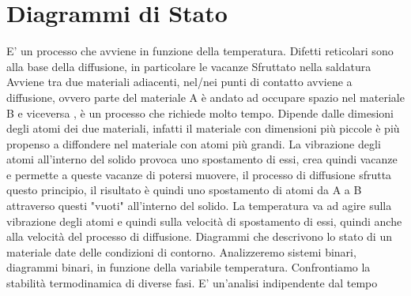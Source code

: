 \documentclass{article}%
\begin{document}
\section{ Diagrammi di Stato }%
\label{sec:DiagrammidiStato}%
E' un processo che avviene in funzione della temperatura.\newline%
%
Difetti reticolari sono alla base della diffusione, in particolare le vacanze\newline%
%
Sfruttato nella saldatura\newline%
%
Avviene tra due materiali adiacenti, nel/nei punti di contatto avviene a diffusione, ovvero parte del materiale A\newline%
%
è andato ad occupare spazio nel materiale B e viceversa , è un processo che richiede molto tempo.\newline%
%
Dipende dalle dimesioni degli atomi dei due materiali, infatti il materiale con dimensioni più piccole è più \newline%
%
propenso a diffondere nel materiale con atomi più grandi.\newline%
%
La vibrazione degli atomi all'interno del solido provoca uno spostamento di essi, crea quindi vacanze e permette\newline%
%
a queste vacanze di potersi muovere, il processo di diffusione sfrutta questo principio, il risultato è quindi uno\newline%
%
spostamento di atomi da A a B attraverso questi "vuoti" all'interno del solido.\newline%
%
La temperatura va ad agire sulla vibrazione degli atomi e quindi sulla velocità di spostamento di essi, quindi\newline%
%
anche alla velocità del processo di diffusione.\newline%
%
\newline%
%
\newline%
%
Diagrammi che descrivono lo stato di un materiale date delle condizioni di contorno.\newline%
%
Analizzeremo sistemi binari, diagrammi binari, in funzione della variabile temperatura.\newline%
%
Confrontiamo la stabilità termodinamica di diverse fasi.\newline%
%
E' un'analisi indipendente dal tempo\newline%
%
\newline%
%
\end{document}
